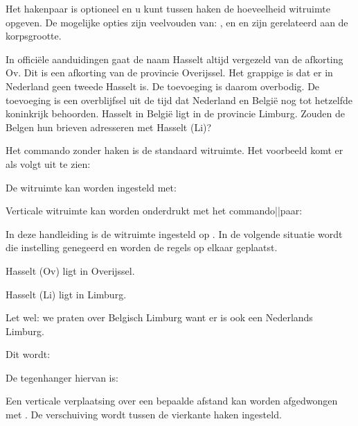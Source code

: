 
Het hakenpaar is optioneel en u kunt tussen haken de
hoeveelheid witruimte opgeven. De mogelijke opties zijn
veelvouden van: ,  en 
en zijn gerelateerd aan de korpsgrootte.

\startbuffer
In offici\"ele aanduidingen gaat de naam Hasselt altijd
vergezeld van de afkorting Ov. Dit is een afkorting van de
provincie Overijssel.
\blanko[2*groot]
Het grappige is dat er in Nederland geen tweede Hasselt is.
De toevoeging is daarom overbodig.
\blanko
De toevoeging is een overblijfsel uit de tijd dat Nederland
en Belgi\"e nog tot hetzelfde koninkrijk behoorden.
\blanko[2*groot]
Hasselt in Belgi\"e ligt in de provincie Limburg. Zouden de
Belgen hun brieven adresseren met Hasselt (Li)?
\stopbuffer

\typebuffer

Het commando \type{\blanko} zonder haken is de standaard
witruimte. Het voorbeeld komt er als volgt uit te zien:

\haalbuffer

De witruimte kan worden ingesteld met:


Verticale witruimte kan worden onderdrukt met het
commando||paar:


In deze handleiding is de witruimte ingesteld op
. In de volgende situatie wordt die instelling
genegeerd en worden de regels op elkaar geplaatst.

\startbuffer
\startopelkaar
Hasselt (Ov) ligt in Overijssel.

Hasselt (Li) ligt in Limburg.

Let wel: we praten over Belgisch Limburg want er is
ook een Nederlands Limburg.
\stopopelkaar
\stopbuffer

\typebuffer

Dit wordt:

\haalbuffer

De tegenhanger hiervan is:


Een verticale verplaatsing over een bepaalde afstand kan
worden afgedwongen met \type{\omlaag}. De verschuiving
wordt tussen de vierkante haken ingesteld.




